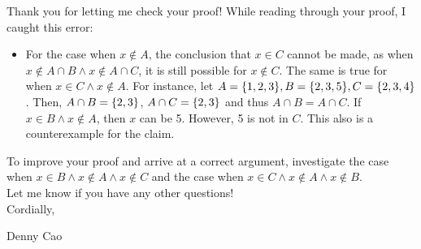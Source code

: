 \documentclass[11pt]{scrartcl}
\theoremstyle{dotlessP}
\theoremstyle{dotlessN}
\DeclarePairedDelimiter\set{\{}{\}}
\newcommand{\inter}{\cap}
\begin{document}
Thank you for letting me check your proof! While reading through your proof, I caught this error: 
\begin{itemize}
	\item For the case when $x \not\in A$, the conclusion that $x \in C$ cannot be made, as when $x \not\in A \inter B \land x \not\in A \inter C$, it is still possible for $x \not\in C$. The same is true for when $x \in C \land x \not\in A$. For instance, let $A = \set*{1,2,3}, B = \set*{2,3, 5}, C = \set*{2,3,4}$. Then,  $A \inter B = \set*{2,3}$, $A \inter C = \set*{2,3}$ and thus $A \inter B = A \inter C$. If  $x \in B \land x \not\in A$, then $x$ can be 5. However, 5 is not in $C$. This also is a counterexample for the claim.
\end{itemize}
To improve your proof and arrive at a correct argument, investigate the case when $x \in B \land x \not\in A \land x \not\in C$ and the case when  $x \in C \land x \not\in A \land x \not\in B$.
\\

Let me know if you have any other questions!
\\

Cordially,

Denny Cao
\end{document}
